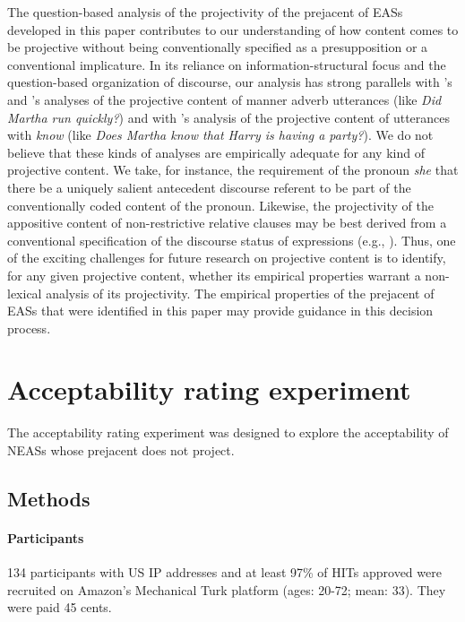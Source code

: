 \documentclass[11pt,fleqn]{article}
\newcommand{\6}{\mbox{$[\hspace*{-.6mm}[$}}
\newcommand{\9}{\mbox{$]\hspace*{-.6mm}]$}}
\newcommand{\citepos}[1]{\citeauthor{#1}'s \citeyear{#1}}
\begin{document}
The question-based analysis of the projectivity of the prejacent of EASs developed in this paper contributes to our understanding of how content comes to be projective without being conventionally specified as a presupposition or a conventional implicature. In its reliance on information-structural focus and the question-based organization of discourse, our analysis has strong parallels with \citepos{abrusan2013} and \citepos{stevens-etal2017} analyses of the projective content of manner adverb utterances (like {\em Did Martha run quickly?}) and with \citepos{best-question} analysis of the projective content of utterances with {\em know} (like {\em Does Martha know that Harry is having a party?}). We do not believe that these kinds of analyses are empirically adequate for any kind of projective content. We take, for instance, the requirement of the pronoun {\em she} that there be a uniquely salient antecedent discourse referent to be part of the conventionally coded content of the pronoun. Likewise, the projectivity of the appositive content of non-restrictive relative clauses may be best derived from a conventional specification of the discourse status of expressions (e.g., \citealt{potts05,murray2014}). Thus, one of the exciting challenges for future research on projective content is to identify, for any given projective content, whether its empirical properties warrant a non-lexical analysis of its projectivity. The empirical properties of the prejacent of EASs that were identified in this paper may provide guidance in this decision process.


\appendix

\section{Acceptability rating experiment}\label{s-acc}

The acceptability rating experiment was designed to explore the acceptability of  NEASs whose prejacent does not project. 

\subsection{Methods}

\paragraph{Participants} 134 participants with US IP addresses and at least 97\% of HITs approved were recruited on Amazon's Mechanical Turk platform (ages: 20-72; mean: 33). They were paid 45 cents.
\end{document}
